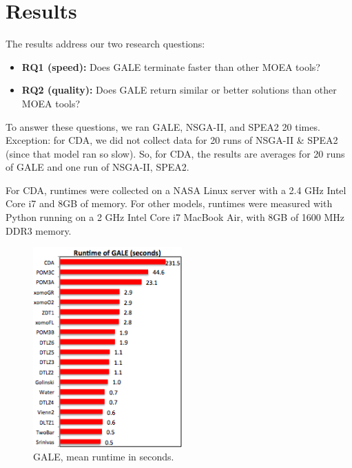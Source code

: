 \documentclass[10pt,journal,compsoc]{IEEEtran}
\newcommand{\bi}{\begin{itemize}}
\newcommand{\ei}{\end{itemize}}
\begin{document}
   

\section{Results}\label{sec:exps}

The results address our two research questions:
\bi
\item 
{\bf RQ1 (speed):} Does GALE terminate faster than other MOEA tools?
\item
{\bf RQ2 (quality):} Does GALE return  similar or better
solutions than other MOEA tools?
\ei
To answer these questions,
we ran GALE, NSGA-II, and SPEA2 20 times.
Exception: for CDA, we did not collect
data for 20 runs of NSGA-II \& SPEA2
(since that model ran so slow).
So, for CDA, the results are
averages for 20 runs of GALE and one run
of NSGA-II, SPEA2.

For CDA, runtimes were collected  on  a NASA Linux server with
a 2.4 GHz Intel Core i7 and 8GB of memory.
For other models,
runtimes were measured with Python  running on 
a 2 GHz Intel Core i7 MacBook Air, with 8GB of 1600 MHz DDR3 memory.



\begin{figure}[!b]
\begin{center}
\includegraphics[width=2.25in]{barcharts_runtime_galeAbsolute_v2.png}
\end{center}
\caption{GALE, mean runtime in seconds.}\label{fig:runGale} 
\end{figure}
\end{document}
